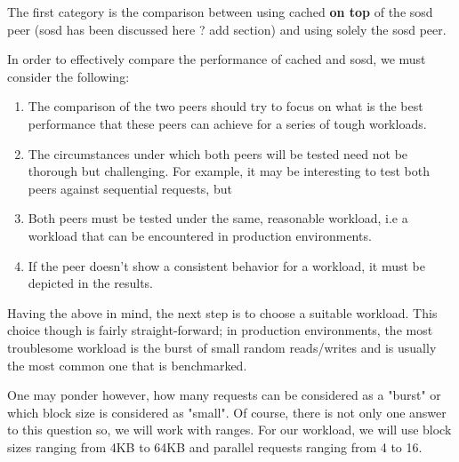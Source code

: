 The first category is the comparison between using cached \textbf{on top} of 
the sosd peer (sosd has been discussed here ? \fixme add section) and using 
solely the sosd peer.

\begin{comment}
The category's goal is to "defend" one of the core thesis arguments, that 
tiering is a key element that will improve the performance of Archipelago.  
\end{comment}

In order to effectively compare the performance of cached and sosd, we must 
consider the following: 

\begin{enumerate}
	\item The comparison of the two peers should try to focus on what is 
		the best performance that these peers can achieve for a series 
		of tough workloads.
	\item The circumstances under which both peers will be tested need not 
		be thorough but challenging. For example, it may be interesting 
		to test both peers against sequential requests, but
	\item Both peers must be tested under the same, reasonable workload, i.e a 
		workload that can be encountered in production environments.
	\item If the peer doesn't show a consistent behavior for a workload, it 
		must be depicted in the results.
\end{enumerate}

Having the above in mind, the next step is to choose a suitable workload.  This 
choice though is fairly straight-forward; in production environments, the most 
troublesome workload is the burst of small random reads/writes and is usually 
the most common one that is benchmarked.  

One may ponder however, how many requests can be considered as a "burst" or 
which block size is considered as "small". Of course, there is not only one 
answer to this question so, we will work with ranges. For our workload, we will 
use block sizes ranging from 4KB to 64KB and parallel requests ranging from 4 
to 16.

